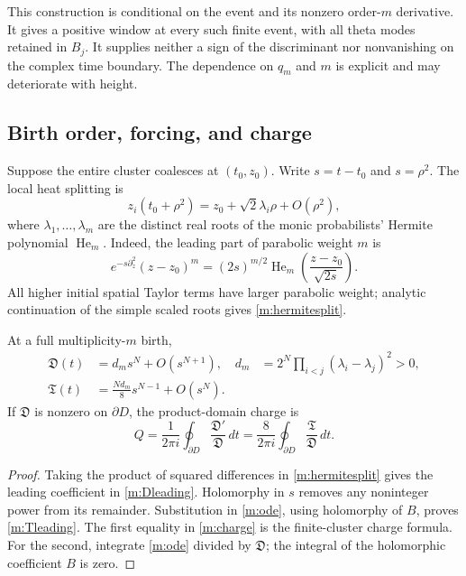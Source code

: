 This construction is conditional on the event and its nonzero order-$m$
derivative.  It gives a positive window at every such finite event,
with all theta modes retained in $B_j$.  It supplies neither a sign of
the discriminant nor nonvanishing on the complex time boundary.
The dependence on $q_m$ and $m$ is explicit and may deteriorate with
height.

\subsection{Birth order, forcing, and charge}

Suppose the entire cluster coalesces at $(t_0,z_0)$.  Write
$s=t-t_0$ and $s=\rho^2$.  The local heat splitting is
\begin{equation}\label{m:hermitesplit}
 z_i(t_0+\rho^2)=z_0+\sqrt2\lambda_i\rho+O(\rho^2),
\end{equation}
where $\lambda_1,\ldots,\lambda_m$ are the distinct real roots of the
monic probabilists' Hermite polynomial $\operatorname{He}_m$.
Indeed, the leading part of parabolic weight $m$ is
\[
 e^{-s\partial_z^2}(z-z_0)^m
    =(2s)^{m/2}\operatorname{He}_m
                   \left(\frac{z-z_0}{\sqrt{2s}}\right).
\]
All higher initial spatial Taylor terms have larger parabolic weight;
analytic continuation of the simple scaled roots gives
\eqref{m:hermitesplit}.

\begin{corollary}\label{m:birth}
At a full multiplicity-$m$ birth,
\begin{align}
 \mathfrak D(t)&=d_ms^N+O(s^{N+1}),
 &d_m&=2^N\prod_{i<j}(\lambda_i-\lambda_j)^2>0,
                                                               \label{m:Dleading}\\
 \mathfrak T(t)&=\frac{Nd_m}{8}s^{N-1}+O(s^N).
                                                               \label{m:Tleading}
\end{align}
If $\mathfrak D$ is nonzero on $\partial D$, the product-domain
charge is
\begin{equation}\label{m:charge}
 Q=\frac{1}{2\pi i}\oint_{\partial D}
                   \frac{\mathfrak D'}{\mathfrak D}\,dt
  =\frac{8}{2\pi i}\oint_{\partial D}
                   \frac{\mathfrak T}{\mathfrak D}\,dt.
\end{equation}
\end{corollary}
\begin{proof}
Taking the product of squared differences in \eqref{m:hermitesplit}
gives the leading coefficient in \eqref{m:Dleading}.  Holomorphy in
$s$ removes any noninteger power from its remainder.  Substitution
in \eqref{m:ode}, using holomorphy of $B$, proves
\eqref{m:Tleading}.  The first equality in \eqref{m:charge} is the
finite-cluster charge formula.  For the second, integrate
\eqref{m:ode} divided by $\mathfrak D$; the integral of the holomorphic
coefficient $B$ is zero.
\end{proof}

